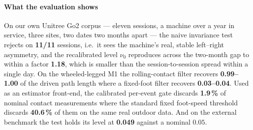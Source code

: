 \paragraph{What the evaluation shows}
On our own Unitree Go2 corpus --- eleven sessions, a machine over a year in service, three sites, two dates two months
apart --- the naive invariance test rejects on \textbf{11/11} sessions, i.e.\ it sees the machine's real, stable
left--right asymmetry, and the recalibrated level $\nu_0$ reproduces across the two-month gap to within a factor
\textbf{1.18}, which is smaller than the session-to-session spread within a single day. On the wheeled-legged M1 the
rolling-contact filter recovers \textbf{0.99--1.00} of the driven path length where a fixed-foot filter recovers
\textbf{0.03--0.04}. Used as an estimator front-end, the calibrated per-event gate discards \textbf{1.9\,\%} of nominal
contact measurements where the standard fixed foot-speed threshold discards \textbf{40.6\,\%} of them on the same real
outdoor data. And on the external benchmark the test holds its level at \textbf{0.049} against a nominal $0.05$.
